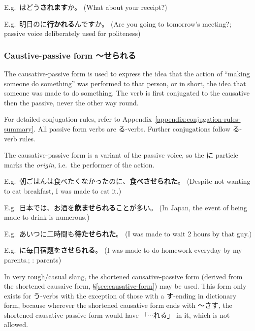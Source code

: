 \documentclass[../nihongo-gakushuu-kyouzai.tex]{subfiles}
\begin{document}
E.g.\ はどう\textbf{されます}か。 (What about your receipt?)

E.g.\ 明日のに\textbf{行かれる}んですか。 (Are you going to tomorrow's meeting?; passive voice deliberately used for politeness)


\subsubsection{Caustive-passive form 〜せられる} \label{sec:causative-passive-form}

The causative-passive form is used to express the idea that the action of ``making someone do something'' was performed to that person, or in short, the idea that someone was made to do something. The verb is first conjugated to the causative then the passive, never the other way round.

For detailed conjugation rules, refer to Appendix~\ref{appendix:conjugation-rules-summary}. All passive form verbs are る-verbs. Further conjugations follow る-verb rules.

The causative-passive form is a variant of the passive voice, so the に particle marks the \emph{origin}, i.e.\ the performer of the action.


E.g.\ 朝ごはんは食べたくなかったのに、\textbf{食べさせられた}。 (Despite not wanting to eat breakfast, I was made to eat it.)

E.g.\ 日本では、お酒を\textbf{飲ませられる}ことが多い。 (In Japan, the event of being made to drink is numerous.)

E.g.\ あいつに二時間も\textbf{待たせられた}。 (I was made to wait 2 hours by that guy.)

E.g.\ に毎日宿題を\textbf{させられる}。 (I was made to do homework everyday by my parents.; : parents)


In very rough/casual slang, the shortened causative-passive form (derived from the shortened causaive form, \S\ref{sec:causative-form}) may be used. This form only exists for う-verbs with the exception of those with a す-ending in dictionary form, because wherever the shortened causative form ends with 〜さす, the shortened causative-passive form would have 「$\cdots$れる」 in it, which is not allowed.
\end{document}
